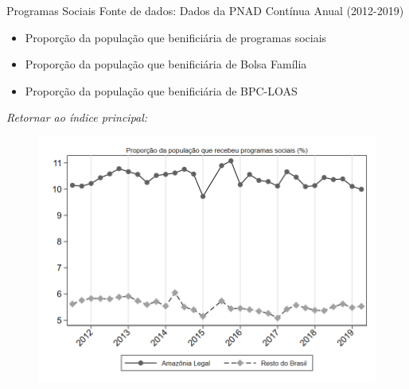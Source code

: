 \begin{frame}[label=_programas_sociais]{Programas Sociais}
{\footnotesize Fonte de dados: Dados da PNAD Contínua Anual (2012-2019)}
\begin{itemize}
\item{Proporção da população que benificiária de programas sociais \hyperlink{_programas_sociais_prop_ajuda_gov}{}}
\item{Proporção da população que benificiária de Bolsa Família  \hyperlink{_programas_sociais_prop_bolsa_familia}{}}
\item{Proporção da população que benificiária de BPC-LOAS  \hyperlink{_programas_sociais_prop_bpc_loas}{}}
\end{itemize}

\begin{small}
\textit{Retornar ao índice principal: \hyperlink{indice_principal}{} }
\end{small}

\end{frame}

\begin{frame}[label=_programas_sociais_prop_ajuda_gov]{}
\textit{\hyperlink{_programas_sociais}{}}
\begin{figure}
  \centering
  \includegraphics[width=1\linewidth]{../../analysis/output/programas_sociais/_programas_sociais_prop_ajuda_gov.png}
  \caption{}
  \label{fig:_programas_sociais_prop_ajuda_gov}
\end{figure}
\end{frame}


